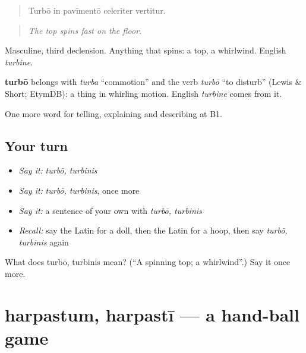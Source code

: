 \begin{quote}
Turbō in pavīmentō celeriter vertitur.
\end{quote}

\begin{quote}
\emph{The top spins fast on the floor.}
\end{quote}

Masculine, third declension. Anything that spins: a top, a whirlwind. English \emph{turbine}.

\begin{cousinweb}
\textbf{turbō} belongs with \emph{turba} \textquotedblleft{}commotion\textquotedblright{} and the verb \emph{turbō} \textquotedblleft{}to disturb\textquotedblright{} (Lewis \& Short; EtymDB): a thing in whirling motion. English \emph{turbine} comes from it.
\end{cousinweb}

\begin{grammarlens}[title={What you've built}]
One more word for telling, explaining and describing at B1.
\end{grammarlens}

\subsection*{Your turn}
\begin{itemize}
\raggedright
  \item \emph{Say it:} \emph{turbō, turbinis}
  \item \emph{Say it:} \emph{turbō, turbinis}, once more
  \item \emph{Say it:} a sentence of your own with \emph{turbō, turbinis}
  \item \emph{Recall:} say the Latin for a doll, then the Latin for a hoop, then say \emph{turbō, turbinis} again
\end{itemize}

\begin{tcolorbox}[breakable,colback=teal!4,colframe=teal!35!black,title={Before you move on}]
What does turbō, turbinis mean? (\textquotedblleft{}A spinning top; a whirlwind\textquotedblright{}.) Say it once more.
\end{tcolorbox}
\section[harpastum, harpastī]{harpastum, harpastī — a hand-ball game}

\label{lesson:LA-C540-harpastum}



